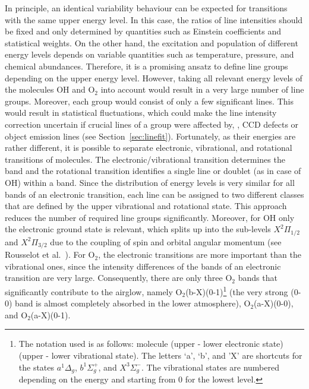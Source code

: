 In principle, an identical variability behaviour can be expected for
transitions with the same upper energy level. In this case, the ratios of line
intensities should be fixed and only determined by quantities such as Einstein
coefficients and statistical weights. On the other hand, the excitation and
population of different energy levels depends on variable quantities such as
temperature, pressure, and chemical abundances. Therefore, it is a promising
ansatz to define line groups depending on the upper energy level. However,
taking all relevant energy levels of the molecules OH and O$_2$ into account
would result in a very large number of line groups. Moreover, each group would
consist of only a few significant lines. This would result in statistical
fluctuations, which could make the line intensity correction uncertain if
crucial lines of a group were affected by, \eg, CCD defects or object emission
lines (see Section~\ref{sec:linefit}). Fortunately, as their energies are
rather different, it is possible to separate electronic, vibrational, and
rotational transitions of molecules. The electronic/vibrational transition
determines the band and the rotational transition identifies a single line or
doublet (as in case of OH) within a band. Since the distribution of energy
levels is very similar for all bands of an electronic transition, each line can
be assigned to two different classes that are defined by the upper vibrational
and rotational state. This approach reduces the number of required line groups
significantly. Moreover, for OH only the electronic ground state is relevant,
which splits up into the sub-levels $X^2\Pi_{1/2}$ and $X^2\Pi_{3/2}$ due to the
coupling of spin and orbital angular momentum (see Rousselot et
al.~\cite{ROU00}). For O$_2$, the electronic transitions are more important
than the vibrational ones, since the intensity differences of the bands of an
electronic transition are very large. Consequently, there are only three O$_2$
bands that significantly contribute to the airglow, namely
O$_2$(b-X)(0-1)\footnote{The notation used is as follows: molecule (upper -
lower electronic state) (upper - lower vibrational state). The letters `a',
`b', and 'X' are shortcuts for the states  $a^1\Delta_g$, $b^1\Sigma^+_g$, and
$X^3\Sigma^-_g$. The vibrational states are numbered depending on the energy
and starting from 0 for the lowest level.} (the very strong (0-0) band is
almost completely absorbed in the lower atmosphere), O$_2$(a-X)(0-0), and
O$_2$(a-X)(0-1).

